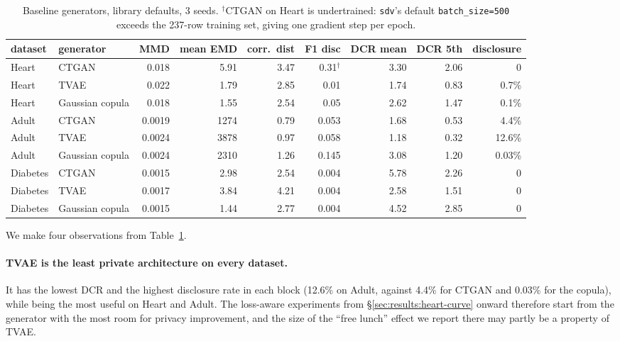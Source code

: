 \documentclass[11pt,a4paper]{article}
\begin{document}
\begin{table}[htbp]
\caption{Baseline generators, library defaults, 3 seeds. $^\dagger$CTGAN on
Heart is undertrained: \texttt{sdv}'s default \texttt{batch\_size=500} exceeds
the 237-row training set, giving one gradient step per epoch.}
\label{tab:baselines}
\centering\small
\begin{adjustbox}{max width=\textwidth}
\begin{tabular}{@{}llrrrrrrr@{}}
\toprule
dataset & generator & MMD & mean EMD & corr.\ dist & F1 disc & DCR mean & DCR 5th & disclosure \\
\midrule
Heart    & CTGAN            & 0.018  & 5.91 & 3.47 & 0.31$^\dagger$ & 3.30 & 2.06 & 0 \\
Heart    & TVAE             & 0.022  & 1.79 & 2.85 & 0.01  & 1.74 & 0.83 & 0.7\% \\
Heart    & Gaussian copula  & 0.018  & 1.55 & 2.54 & 0.05  & 2.62 & 1.47 & 0.1\% \\
\midrule
Adult    & CTGAN            & 0.0019 & 1274 & 0.79 & 0.053 & 1.68 & 0.53 & 4.4\% \\
Adult    & TVAE             & 0.0024 & 3878 & 0.97 & 0.058 & 1.18 & 0.32 & 12.6\% \\
Adult    & Gaussian copula  & 0.0024 & 2310 & 1.26 & 0.145 & 3.08 & 1.20 & 0.03\% \\
\midrule
Diabetes & CTGAN            & 0.0015 & 2.98 & 2.54 & 0.004 & 5.78 & 2.26 & 0 \\
Diabetes & TVAE             & 0.0017 & 3.84 & 4.21 & 0.004 & 2.58 & 1.51 & 0 \\
Diabetes & Gaussian copula  & 0.0015 & 1.44 & 2.77 & 0.004 & 4.52 & 2.85 & 0 \\
\bottomrule
\end{tabular}
\end{adjustbox}
\end{table}

We make four observations from Table~\ref{tab:baselines}.

\paragraph{TVAE is the least private architecture on every dataset.} It has
the lowest DCR and the highest disclosure rate in each block (12.6\% on Adult,
against 4.4\% for CTGAN and 0.03\% for the copula), while being the most
useful on Heart and Adult. The loss-aware experiments from
\S\ref{sec:results:heart-curve} onward therefore start from the generator with
the most room for privacy improvement, and the size of the ``free lunch''
effect we report there may partly be a property of TVAE.
\end{document}
